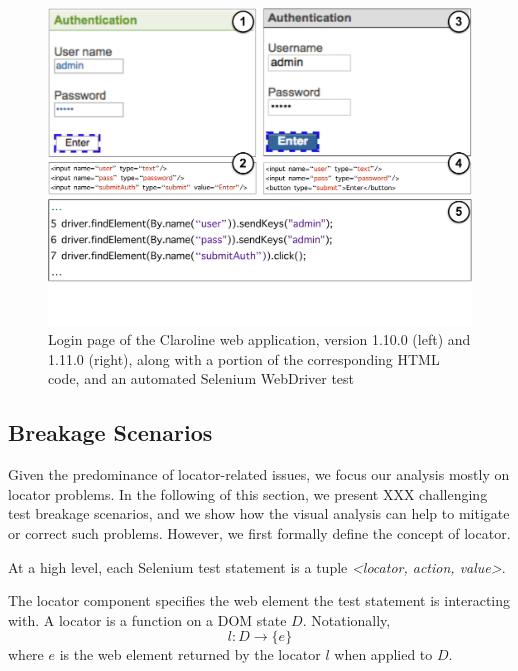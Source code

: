 \begin{figure}[t]
\centering
\includegraphics[trim={0cm 3.5cm 0cm 0cm},clip,scale=0.24]{images/claroline-together-3}
\caption{Login page of the Claroline web application, version 1.10.0 (left) and 1.11.0 (right), along with a portion of the corresponding HTML code, and an automated Selenium WebDriver test}
\label{claroline-together}
\end{figure}

\subsection{Breakage Scenarios}\label{sec:breakage-scenarios}

Given the predominance of locator-related issues, we focus our analysis mostly on locator problems. In the following of this section, we present XXX challenging test breakage scenarios, and we show how the visual analysis can help to mitigate or correct such problems. However, we first formally define the concept of locator.

\begin{defn}
At a high level, each Selenium test statement is a tuple \textit{<locator, action, value>}.
\end{defn}

\begin{defn} 
The locator component specifies the web element the test statement is interacting with. A locator is a function on a DOM state $D$. Notationally, $$l: D \rightarrow \{e\}$$ where $e$ is the web element returned by the locator $l$ when applied to $D$. 
\end{defn}

